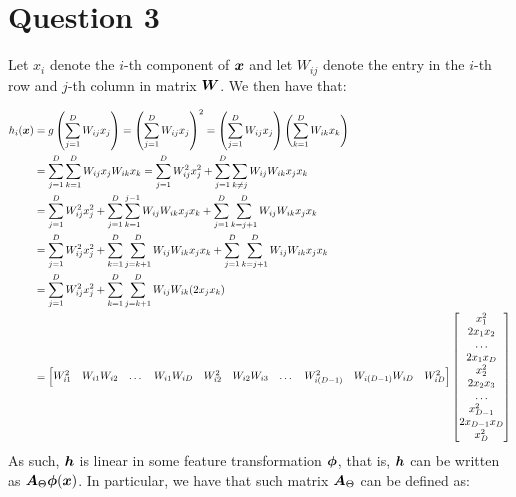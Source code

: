 \documentclass{exam}
\begin{document}
    \section*{Question 3}
    \begin{questions}
        \question
        Let $x_i$ denote the $i$-th component of $\vb*{x}$ and let $W_{ij}$ denote the entry in the $i$-th row and $j$-th column in matrix $\vb*{W}$. We then have that:

        \begin{align*}
            h_i(\vb*{x}) &= g\left(\sum_{j = 1}^{D} W_{ij}x_j \right) = \left(\sum_{j = 1}^{D} W_{ij}x_j \right)^2 = \left(\sum_{j = 1}^{D} W_{ij}x_j\right)\left( \sum_{k = 1}^{D} W_{ik}x_k\right) \\
            &= \sum_{j = 1}^{D} \sum_{k = 1}^{D} W_{ij}x_j  W_{ik}x_k = \sum_{j = 1}^{D} W_{ij}^2x_j^2 +  \sum_{j = 1}^{D} \sum_{k \neq j} W_{ij}W_{ik}x_j x_k \\
            &= \sum_{j = 1}^{D} W_{ij}^2x_j^2 + \sum_{j = 1}^{D} \sum_{k = 1}^{j - 1}  W_{ij}W_{ik}x_j x_k + 
            \sum_{j = 1}^{D} \sum_{k = j + 1}^{D}  W_{ij}W_{ik}x_j x_k \\
            &= \sum_{j = 1}^{D} W_{ij}^2x_j^2 +\sum_{k = 1}^{D} \sum_{j = k + 1}^{D}  W_{ij}W_{ik}x_j x_k + 
            \sum_{j = 1}^{D} \sum_{k = j + 1}^{D}  W_{ij}W_{ik}x_j x_k \\
            &= \sum_{j = 1}^{D} W_{ij}^2x_j^2 + \sum_{k = 1}^{D} \sum_{j = k + 1}^{D} W_{ij}W_{ik}(2x_j x_k) \\
            &= 
            \begin{bmatrix}
                W_{i1}^2 & W_{i1}W_{i2} & \dots & W_{i1}W_{iD} & W_{i2}^2 & W_{i2}W_{i3} & \dots & W_{i(D - 1)}^2  & W_{i(D - 1)} W_{iD} &  W_{iD}^2
            \end{bmatrix}
            \begin{bmatrix}
                x_1^2 \\ 2x_1 x_2 \\ \dots \\ 2x_1 x_D \\ x_2^2 \\ 2x_2 x_3 \\ \dots \\ x_{D - 1}^2 \\ 2x_{D - 1} x_{D} \\  x_{D}^2
            \end{bmatrix}
        \end{align*}
        As such, $\vb*{h}$ is linear in some feature transformation $\vb*{\phi}$, that is, $\vb*{h}$ can be written as $\vb*{A}_{\Theta}\vb*{\phi}(\vb*{x})$. In particular, we have that such matrix $\vb*{A}_{\Theta}$ can be defined as:

\end{questions}
\end{document}
